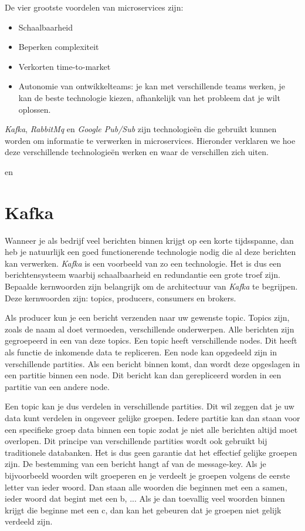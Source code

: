 De vier grootste voordelen van microservices zijn: 
\begin{itemize}
    \item Schaalbaarheid
    \item Beperken complexiteit
    \item Verkorten time-to-market
    \item Autonomie van ontwikkelteams: je kan met verschillende teams werken, je kan de beste technologie kiezen, afhankelijk van het probleem dat je wilt oplossen.
\end{itemize}

\emph{Kafka}, \emph{RabbitMq} en \emph{Google Pub/Sub} zijn technologieën die gebruikt kunnen worden om informatie te verwerken in microservices. Hieronder verklaren we hoe deze verschillende technologieën werken en waar de verschillen zich uiten.

 \autocite{Claudio2017} en \autocite{Velthoven2016}

\section{Kafka}

Wanneer je als bedrijf veel berichten binnen krijgt op een korte tijdsspanne, dan heb je natuurlijk een goed functionerende technologie nodig die al deze berichten kan verwerken. \emph{Kafka} is een voorbeeld van zo een technologie. Het is dus een berichtensysteem waarbij schaalbaarheid en redundantie een grote troef zijn. Bepaalde kernwoorden zijn belangrijk om de architectuur van \emph{Kafka} te begrijpen. Deze kernwoorden zijn: topics, producers, consumers en brokers.  

Als producer kun je een bericht verzenden naar uw gewenste topic. Topics zijn, zoals de naam al doet vermoeden, verschillende onderwerpen. Alle berichten zijn gegroepeerd in een van deze topics. Een topic heeft verschillende nodes. Dit heeft als functie de inkomende data te repliceren. Een node kan opgedeeld zijn in verschillende partities. Als een bericht binnen komt, dan wordt deze opgeslagen in een partitie binnen een node. Dit bericht kan dan gerepliceerd worden in een partitie van een andere node. 

Een topic kan je dus verdelen in verschillende partities. Dit wil zeggen dat je uw data kunt verdelen in ongeveer gelijke groepen. Iedere partitie kan dan staan voor een specifieke groep data binnen een topic zodat je niet alle berichten altijd moet overlopen. Dit principe van verschillende partities wordt ook gebruikt bij traditionele databanken. Het is dus geen garantie dat het effectief gelijke groepen zijn. De bestemming van een bericht hangt af van de message-key. Als je bijvoorbeeld woorden wilt groeperen en je verdeelt je groepen volgens de eerste letter van ieder woord. Dan staan alle woorden die beginnen met een a samen, ieder woord dat begint met een b, ... Als je dan toevallig veel woorden binnen krijgt die beginne met een c, dan kan het gebeuren dat je groepen niet gelijk verdeeld zijn.

